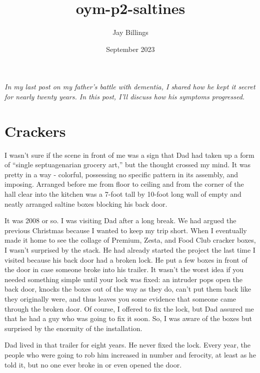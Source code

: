 \documentclass{article}
\title{oym-p2-saltines}
\author{Jay Billings}
\date{September 2023}
\begin{document}
\maketitle

\textit{In my last post on my father's battle with dementia, I shared how he kept it secret for nearly twenty years. In this post, I'll discuss how his symptoms progressed.}

\section*{Crackers}

I wasn't sure if the scene in front of me was a sign that Dad had taken up a form of ``single septuagenarian grocery art,'' but the thought crossed my mind. It was pretty in a way - colorful, possessing no specific pattern in its assembly, and imposing. Arranged before me from floor to ceiling and from the corner of the hall clear into the kitchen was a 7-foot tall by 10-foot long wall of empty and neatly arranged saltine boxes blocking his back door.

It was 2008 or so. I was visiting Dad after a long break. We had argued the previous Christmas because I wanted to keep my trip short. When I eventually made it home to see the collage of Premium, Zesta, and Food Club cracker boxes, I wasn't surprised by the stack. He had already started the project the last time I visited because his back door had a broken lock. He put a few boxes in front of the door in case someone broke into his trailer. It wasn't the worst idea if you needed something simple until your lock was fixed: an intruder pops open the back door, knocks the boxes out of the way as they do, can't put them back like they originally were, and thus leaves you some evidence that someone came through the broken door. Of course, I offered to fix the lock, but Dad assured me that he had a guy who was going to fix it soon. So, I was aware of the boxes but surprised by the enormity of the installation.

Dad lived in that trailer for eight years. He never fixed the lock. Every year, the people who were going to rob him increased in number and ferocity, at least as he told it, but no one ever broke in or even opened the door.
\end{document}
